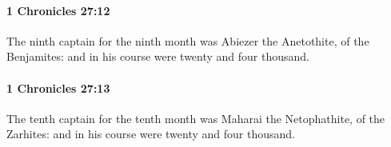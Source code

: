 		\paragraph{1 Chronicles 27:12} %
			\label{1CHRONICLES-27-12}

			The ninth captain for the ninth month was Abiezer the Anetothite, of the Benjamites: and in his course were twenty and four thousand.


		\paragraph{1 Chronicles 27:13} %
			\label{1CHRONICLES-27-13}

			The tenth captain for the tenth month was Maharai the Netophathite, of the Zarhites: and in his course were twenty and four thousand.


